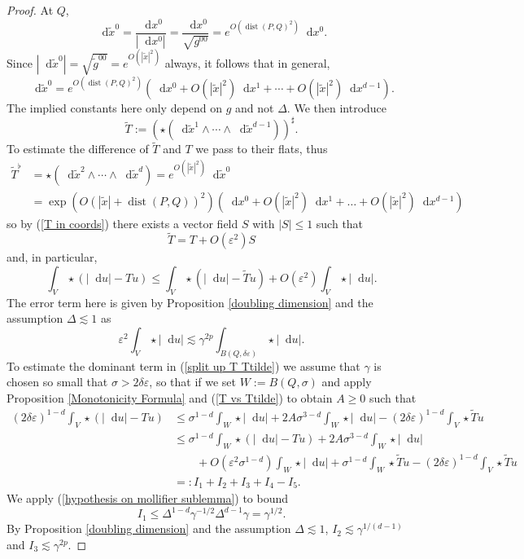 \documentclass[reqno,12pt,letterpaper]{amsart}
\newcommand*\dif{\mathop{}\!\mathrm{d}}
\DeclareMathOperator{\dist}{dist}
\theoremstyle{definition}
\numberwithin{equation}{section}
\begin{document}
\begin{proof}
At $Q$,
$$\dif \tilde x^0 = \frac{\dif x^0}{|\dif x^0|} = \frac{\dif x^0}{\sqrt{g^{00}}} = e^{O(\dist(P, Q)^2)} \dif x^0.$$
Since $|\dif \tilde x^0| = \sqrt{\tilde g^{00}} = e^{O(|\tilde x|^2)}$ always, it follows that in general,
$$\dif \tilde x^0 = e^{O(\dist(P, Q)^2)}\left(\dif x^0 + O(|\tilde x|^2) \dif x^1 + \cdots + O(|\tilde x|^2) \dif x^{d-1}\right).$$
The implied constants here only depend on $g$ and not $\Delta$.
We then introduce
$$\tilde T := (\star (\dif \tilde x^1 \wedge \cdots \wedge \dif \tilde x^{d-1}))^\sharp.$$
To estimate the difference of $\tilde T$ and $T$ we pass to their flats, thus
\begin{align*}
\tilde T^\flat &= \star(\dif \tilde x^2 \wedge \cdots \wedge \dif \tilde x^d) = e^{O(|\tilde x|^2)} \dif \tilde x^0 \\
&= \exp\left(O(|\tilde x| + \dist(P, Q))^2\right) \left(\dif x^0 + O(|\tilde x|^2) \dif x^1 + \dots + O(|\tilde x|^2) \dif x^{d-1}\right)
\end{align*}
so by (\ref{T in coords}) there exists a vector field $S$ with $|S| \leq 1$ such that
\begin{equation}\label{T vs Ttilde}
\tilde T = T + O(\varepsilon^2)S
\end{equation}
and, in particular,
\begin{equation}\label{split up T Ttilde}
\int_V \star (|\dif u| - Tu) \leq \int_V \star (|\dif u| - \tilde Tu) + O(\varepsilon^2) \int_V \star |\dif u|.
\end{equation}
The error term here is given by Proposition \ref{doubling dimension} and the assumption $\Delta \lesssim 1$ as
$$\varepsilon^2 \int_V \star |\dif u| \lesssim \gamma^{2p} \int_{B(Q, \delta\varepsilon)} \star |\dif u|.$$
To estimate the dominant term in (\ref{split up T Ttilde}) we assume that $\gamma$ is chosen so small that $\sigma > 2\delta\varepsilon$, so that if we set $W := B(Q, \sigma)$ and apply Proposition \ref{Monotonicity Formula} and (\ref{T vs Ttilde}) to obtain $A \geq 0$ such that
\begin{align*}
(2\delta\varepsilon)^{1 - d} \int_V \star(|\dif u| - Tu)
&\leq \sigma^{1 - d}\int_W \star |\dif u| + 2A\sigma^{3 - d} \int_W \star |\dif u| - (2\delta\varepsilon)^{1 - d}\int_V \star \tilde Tu\\
&\leq \sigma^{1 - d}\int_W \star(|\dif u| - Tu) + 2A\sigma^{3 - d} \int_W \star |\dif u| \\
&\qquad + O(\varepsilon^2 \sigma^{1 - d}) \int_W \star |\dif u| + \sigma^{1 - d}\int_W \star \tilde Tu - (2\delta\varepsilon)^{1 - d}\int_V \star \tilde Tu\\
&=: I_1 + I_2 + I_3 + I_4 - I_5.
\end{align*}
We apply (\ref{hypothesis on mollifier sublemma}) to bound
$$I_1 \leq \Delta^{1 - d} \gamma^{-1/2} \Delta^{d - 1} \gamma = \gamma^{1/2}.$$
By Proposition \ref{doubling dimension} and the assumption $\Delta \lesssim 1$, $I_2 \lesssim \gamma^{1/(d - 1)}$ and $I_3 \lesssim \gamma^{2p}$.


\end{proof}
\end{document}
